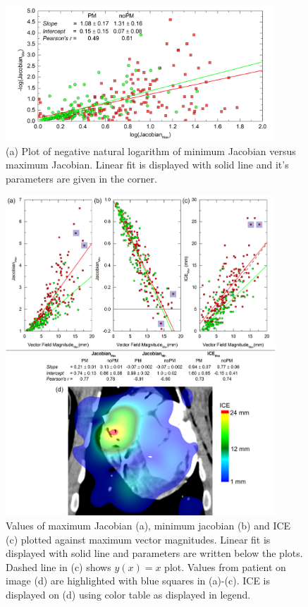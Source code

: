 \documentclass[type=dr, dr=rernat, accentcolor=tud7b,colorbacktitle, bigchapter, openright, twoside, 12pt ]{tudthesis}
\begin{document}
\begin{figure}[H]
	\begin{center}		
		\includegraphics[width=0.9\textwidth]{./Images/JacSum2.png}
		\caption{(a) Plot of negative natural logarithm of minimum Jacobian versus maximum Jacobian. Linear fit is displayed with solid line and it's parameters are given in the corner.}
		\label{calcJac_pigs}
	\end{center}
\end{figure}

\begin{figure}[H]
	\begin{center}		
		\includegraphics[width=0.9\textwidth]{./Images/MaxVfdata_pigs.png}
		\caption{Values of maximum Jacobian (a), minimum jacobian (b) and ICE (c) plotted against maximum vector magnitudes. Linear fit is displayed with solid line and parameters are written below the plots. Dashed line in (c) shows $y(x)= x$ plot. Values from patient on image (d) are highlighted with blue squares in (a)-(c).
			ICE is displayed on (d) using color table as displayed in legend.}
		\label{maxvf_pigs}
	\end{center}
\end{figure}
\end{document}
